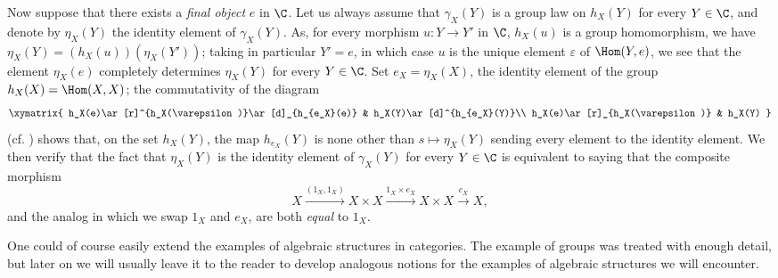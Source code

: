 \begin{env}[8.2.7]
\label{0.8.2.7}
Now suppose that there exists a \emph{final object} $e$  in $\C$.
Let us always assume that $\gamma_X(Y)$ is a group law on $h_X(Y)$ for every $Y\in\C$, and denote by $\eta_X(Y)$ the identity element of $\gamma_X(Y)$.
As, for every morphism $u:Y\to Y'$ in $\C$, $h_X(u)$ is a group homomorphism, we have $\eta_X(Y)=(h_X(u))(\eta_X(Y'))$; taking in particular $Y'=e$, in which case $u$ is the unique element $\varepsilon$ of $\Hom(Y,e)$, we see that the element $\eta_X(e)$ completely determines $\eta_X(Y)$ for every $Y\in\C$.
Set $e_X=\eta_X(X)$, the identity element of the group $h_X(X)=\Hom(X,X)$; the commutativity of the diagram
\[
  \xymatrix{
    h_X(e)\ar[r]^{h_X(\varepsilon)}\ar[d]_{h_{e_X}(e)} &
    h_X(Y)\ar[d]^{h_{e_X}(Y)}\\
    h_X(e)\ar[r]_{h_X(\varepsilon)} &
    h_X(Y)
  }
\]
(cf. ) shows that, on the set $h_X(Y)$, the map $h_{e_X}(Y)$ is none other than
$s\mapsto\eta_X(Y)$ sending every element to the identity element.
We then verify that the fact that $\eta_X(Y)$ is the identity element of $\gamma_X(Y)$ for every $Y\in\C$ is equivalent to saying that the composite morphism
\[
  X\xrightarrow{(1_X,1_X)}X\times X\xrightarrow{1_X\times e_X}X\times X\xrightarrow{c_X}X,
\]
and the analog in which we swap $1_X$ and $e_X$, are both \emph{equal} to $1_X$.
\end{env}

\begin{env}[8.2.8]
\label{0.8.2.8}
One could of course easily extend the examples of algebraic structures in categories.
The example of groups was treated with enough detail, but later on we will usually leave it to the reader to develop analogous notions for the examples of algebraic structures we will encounter.
\end{env}
